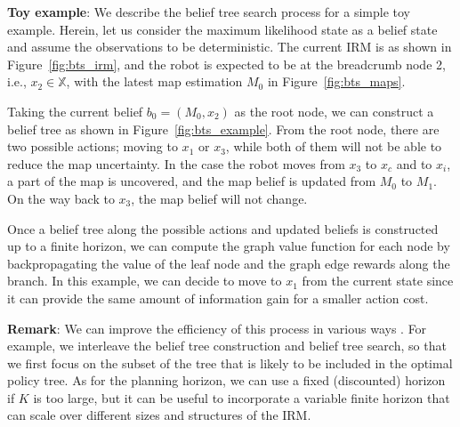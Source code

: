 \documentclass{article}
\newcommand{\ph}[1]{{\textbf{#1}:}} %
\newcommand{\todo}[1]{{\color{red} #1 }} %
\begin{document}
\ph{Toy example}
We describe the belief tree search process for a simple toy example.
Herein, let us consider the maximum likelihood state as a belief state and assume the observations to be deterministic.
The current IRM is as shown in Figure~\ref{fig:bts_irm}, and the robot is expected to be at the breadcrumb node 2, i.e., $x_2 \in \mathbb{X}$, with the latest map estimation $M_0$ in Figure~\ref{fig:bts_maps}.

Taking the current belief $b_0 = (M_0, x_2)$ as the root node, we can construct a belief tree as shown in Figure~\ref{fig:bts_example}.
From the root node, there are two possible actions; moving to $x_1$ or $x_3$, while both of them will not be able to reduce the map uncertainty.
In the case the robot moves from $x_3$ to $x_c$ and to $x_i$, a part of the map is uncovered, and the map belief is updated from $M_0$ to $M_{1}$.
On the way back to $x_3$, the map belief will not change.

Once a belief tree along the possible actions and updated beliefs is constructed up to a finite horizon, we can compute the graph value function for each node by backpropagating the value of the leaf node and the graph edge rewards along the branch.
In this example, we can decide to move to $x_1$ from the current state since it can provide the same amount of information gain for a smaller action cost.


\ph{Remark} We can improve the efficiency of this process in various ways \cite{silver2010monte,somani2013despot,bonet1998learning,kim2019pomhdp}.
For example, we interleave the belief tree construction and belief tree search, so that we first focus on the subset of the tree that is likely to be included in the optimal policy tree. As for the planning horizon, we can use a fixed (discounted) horizon if $K$ is too large, but it can be useful to incorporate a variable finite horizon that can scale over different sizes and structures of the IRM.


\end{document}
